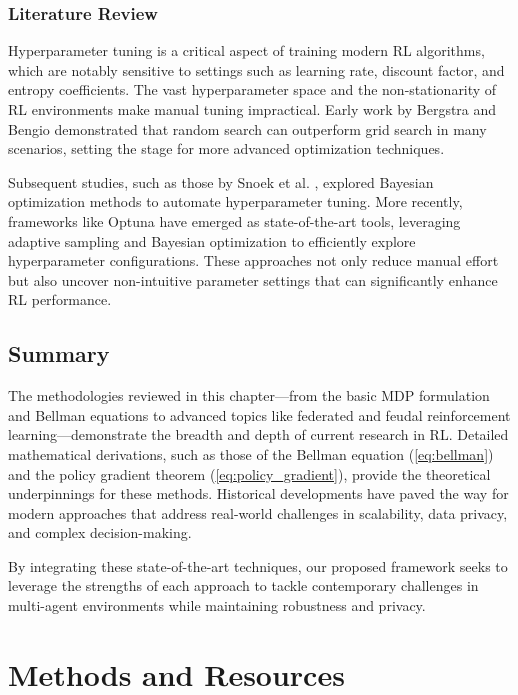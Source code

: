 \documentclass[12pt,a4paper,twoside,openany]{book}
\begin{document}
\subsection*{Literature Review}

Hyperparameter tuning is a critical aspect of training modern RL algorithms, which are notably sensitive to settings such as learning rate, discount factor, and entropy coefficients. The vast hyperparameter space and the non-stationarity of RL environments make manual tuning impractical. Early work by Bergstra and Bengio \cite{Bergstra2012} demonstrated that random search can outperform grid search in many scenarios, setting the stage for more advanced optimization techniques.

Subsequent studies, such as those by Snoek et al. \cite{Snoek2012}, explored Bayesian optimization methods to automate hyperparameter tuning. More recently, frameworks like Optuna \cite{Optuna} have emerged as state-of-the-art tools, leveraging adaptive sampling and Bayesian optimization to efficiently explore hyperparameter configurations. These approaches not only reduce manual effort but also uncover non-intuitive parameter settings that can significantly enhance RL performance.


\section{Summary}

The methodologies reviewed in this chapter—from the basic MDP formulation and Bellman equations to advanced topics like federated and feudal reinforcement learning—demonstrate the breadth and depth of current research in RL. Detailed mathematical derivations, such as those of the Bellman equation (\ref{eq:bellman}) and the policy gradient theorem (\ref{eq:policy_gradient}), provide the theoretical underpinnings for these methods. Historical developments have paved the way for modern approaches that address real-world challenges in scalability, data privacy, and complex decision-making.

By integrating these state-of-the-art techniques, our proposed framework seeks to leverage the strengths of each approach to tackle contemporary challenges in multi-agent environments while maintaining robustness and privacy.


\chapter{Methods and Resources}
\end{document}
